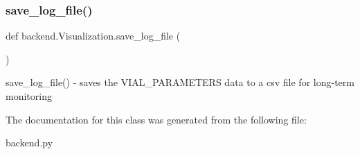 \subsubsection{\texorpdfstring{save\+\_\+log\+\_\+file()}{save\_log\_file()}}
{\footnotesize\ttfamily def backend.\+Visualization.\+save\+\_\+log\+\_\+file (\begin{DoxyParamCaption}{ }\end{DoxyParamCaption})}

\begin{DoxyVerb}save_log_file()
    - saves the VIAL_PARAMETERS data to a csv file for long-term monitoring
\end{DoxyVerb}
 

The documentation for this class was generated from the following file\+:\begin{DoxyCompactItemize}
\item 
backend.\+py\end{DoxyCompactItemize}
